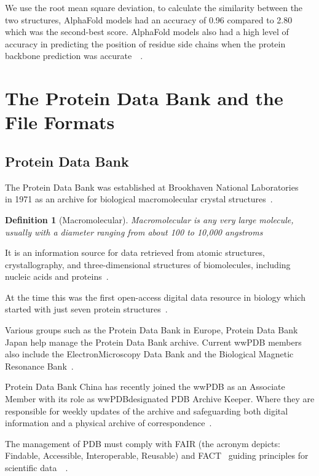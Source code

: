 \documentclass{report}
\newtheorem{definition}{Definition}[section]
\begin{document}
We use the root mean square deviation, to calculate the similarity between the two structures, AlphaFold models had an accuracy of 0.96 compared to 2.80 which was the second-best score. AlphaFold models also had a high level of accuracy in predicting the position of residue side chains when the protein backbone prediction was accurate~\cite{david_alphafold_2022}~\cite{jumper_highly_2021}.


\section{The Protein Data Bank and the File Formats}

\subsection{Protein Data Bank}

The Protein Data Bank was established at Brookhaven National Laboratories ~\cite{bernstein_protein_1977} in 1971 as an archive for biological macromolecular crystal structures~\cite{berman_protein_2000}.

\begin{definition}[Macromolecular]
    Macromolecular is any very large molecule, usually with a diameter ranging from about 100 to 10,000 angstroms
\end{definition}

It is an information source for data retrieved from atomic structures, crystallography, and three-dimensional structures of biomolecules, including nucleic acids and proteins~\cite{behzadi_worldwide_2021}. 

At the time this was the first open-access digital data resource in biology which started with just seven protein structures~\cite{burley_rcsb_2022}.

Various groups such as the Protein Data Bank in Europe, Protein Data Bank Japan help manage the Protein Data Bank archive. Current wwPDB members also include the ElectronMicroscopy Data Bank and the Biological Magnetic Resonance Bank~\cite{burley_rcsb_2022}.

Protein Data Bank China has recently joined the wwPDB as an Associate Member with its role as wwPDBdesignated PDB Archive Keeper. Where they are responsible for weekly updates of the archive and safeguarding both digital information and a physical archive of correspondence~\cite{burley1_rcsb_2022}.

The management of PDB must comply with FAIR (the acronym depicts: Findable, Accessible, Interoperable, Reusable) and FACT~\cite{van_der_aalst_responsible_2017} guiding principles for scientific data~\cite{wilkinson_fair_2016}~\cite{westbrook_impact_2020}.
\end{document}

